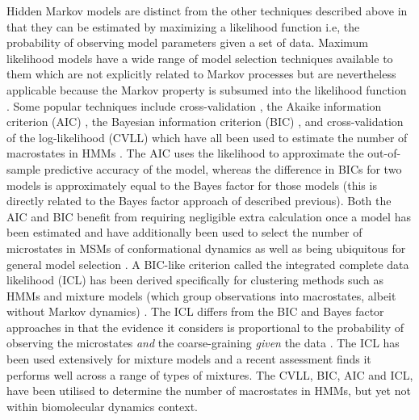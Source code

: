 Hidden Markov models are distinct from the other techniques described above in that they can be estimated by maximizing a likelihood function \cite{wuProjectedMetastableMarkov2015, noeProjectedHiddenMarkov2013a} i.e, the probability of observing model parameters given a set of data.  Maximum likelihood models have a wide range of model selection techniques available to them which are not explicitly related to Markov processes but are nevertheless applicable because the Markov property is subsumed into the likelihood function \cite[chapter 7]{friedman2001elements}\cite{milliganExaminationProceduresDetermining1985, mclachlanFiniteMixtureModels2000}.  Some popular techniques include cross-validation \cite{arlotSurveyCrossvalidationProcedures2009}, the Akaike information criterion (AIC) \cite{akaikeInformationTheoryExtension1998}, the  Bayesian information criterion (BIC) \cite{schwarzEstimatingDimensionModel1978a}, and cross-validation of the log-likelihood (CVLL) which have all  been used to estimate the number of macrostates in HMMs \cite{celeuxSelectingHiddenMarkov2008}. The AIC uses the likelihood to approximate the out-of-sample predictive accuracy of the model, whereas the difference in BICs for two models is approximately equal to the Bayes factor for those models (this is directly related to the Bayes factor approach of \cite{bacalladoBayesianComparisonMarkov2009a} described previous). Both the AIC and BIC benefit from requiring negligible extra calculation once a model has been estimated and have additionally been used to select the number of microstates in MSMs of conformational dynamics \cite{mcgibbonStatisticalModelSelection2014a} as well as being ubiquitous for general model selection \cite[chapter 7]{friedman2001elements}.  A BIC-like criterion called the integrated complete data likelihood (ICL) \cite{biernackiAssessingMixtureModel2000a} has been derived specifically for clustering methods such as HMMs and mixture models (which  group observations into macrostates, albeit without Markov dynamics) \cite{mclachlanFiniteMixtureModels2000}. The ICL differs from the BIC and Bayes factor approaches in that the evidence it considers is proportional to the probability of observing the microstates \emph{and} the coarse-graining \emph{given} the data \cite{biernackiAssessingMixtureModel2000a,mclachlanFiniteMixtureModels2000}.  The ICL has been used extensively \cite{mclachlanFiniteMixtureModels2000} for mixture models and a recent assessment \cite{brochadoDeterminingNumberComponents2020} finds it performs well across a range of types of mixtures. The CVLL, BIC, AIC and ICL, have been utilised to determine the number of macrostates in HMMs, but yet not within biomolecular dynamics context.  


